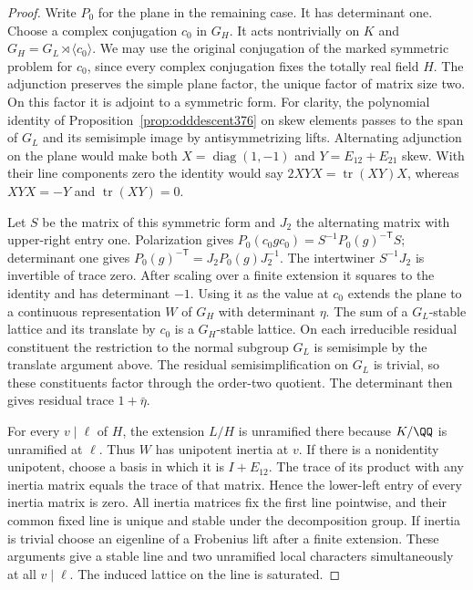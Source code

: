 \documentclass[a4paper,11pt]{article}
\theoremstyle{definition}
\theoremstyle{remark}
\numberwithin{equation}{section}
\begin{document}
\begin{proof}
Write \(P_0\) for the plane in the remaining case. It has
determinant one. Choose a complex conjugation \(c_0\) in \(G_H\).
It acts nontrivially on \(K\) and \(G_H=G_L\rtimes\langle c_0\rangle\).
We may use the original conjugation of the marked symmetric
problem for \(c_0\), since every complex conjugation fixes the
totally real field \(H\). The adjunction preserves the simple
plane factor, the unique factor of matrix size two. On this
factor it is adjoint to a symmetric form. For clarity, the
polynomial identity of Proposition~\ref{prop:odddescent376}
on skew elements passes to the span of \(G_L\) and its semisimple
image by antisymmetrizing lifts. Alternating adjunction on the
plane would make both
\(X=\operatorname{diag}(1,-1)\) and \(Y=E_{12}+E_{21}\) skew.
With their line components zero the identity would say
\(2XYX=\operatorname{tr}(XY)X\), whereas \(XYX=-Y\) and
\(\operatorname{tr}(XY)=0\).

Let \(S\) be the matrix of this symmetric form and \(J_2\)
the alternating matrix with upper-right entry one. Polarization
gives \(P_0(c_0gc_0)=S^{-1}P_0(g)^{-{\mathsf T}}S\);
determinant one gives \(P_0(g)^{-{\mathsf T}}=J_2P_0(g)J_2^{-1}\).
The intertwiner \(S^{-1}J_2\) is invertible of trace zero.
After scaling over a finite extension it squares to the identity
and has determinant \(-1\). Using it as the value at \(c_0\)
extends the plane to a continuous representation \(W\) of \(G_H\)
with determinant \(\eta\). The sum of a \(G_L\)-stable lattice and
its translate by \(c_0\) is a \(G_H\)-stable lattice. On each
irreducible residual constituent the restriction to the normal
subgroup \(G_L\) is semisimple by the translate argument above.
The residual semisimplification on \(G_L\) is trivial, so these
constituents factor through the order-two quotient. The determinant
then gives residual trace \(1+\bar\eta\).

For every \(v\mid\ell\) of \(H\), the extension \(L/H\) is
unramified there because \(K/\QQ\) is unramified at \(\ell\).
Thus \(W\) has unipotent inertia at \(v\). If there is a
nonidentity unipotent, choose a basis in which it is \(I+E_{12}\).
The trace of its product with any inertia matrix equals the trace
of that matrix. Hence the lower-left entry of every inertia matrix
is zero. All inertia matrices fix the first line pointwise, and
their common fixed line is unique and stable under the decomposition
group. If inertia is trivial choose an eigenline of a Frobenius
lift after a finite extension. These arguments give a stable line
and two unramified local characters simultaneously at all
\(v\mid\ell\). The induced lattice on the line is saturated.


\end{proof}
\end{document}
